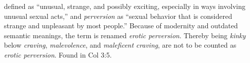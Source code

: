 defined as ``unusual, strange, and possibly exciting, especially in ways involving unusual sexual acts,'' and \emph{perversion} as ``sexual behavior that is considered strange and unpleasant by most people.'' Because of modernity and outdated semantic meanings, the term is renamed \emph{erotic perversion}. Thereby being \emph{kinky} below \emph{craving}, \emph{malevolence}, and \emph{maleficent craving}, are not to be counted as \emph{erotic perversion}. 
Found in Col 3:5.
